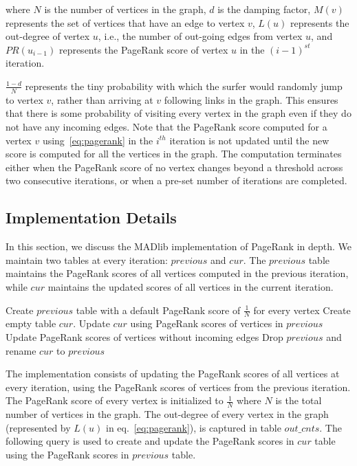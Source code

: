 where $N$ is the number of vertices in the graph, $d$ is the damping factor,
$M(v)$ represents the set of vertices that have an edge to vertex $v$,
$L(u)$ represents the out-degree of vertex $u$, i.e., the number of
out-going edges from vertex $u$, and $PR(u_{i-1})$ represents the PageRank
score of vertex $u$ in the $(i-1)^{st}$ iteration.

$\frac{1-d}{N}$ represents the tiny probability with which the surfer
would randomly jump to vertex $v$, rather than arriving at $v$ following
links in the graph. This ensures that there is some probability of visiting
every vertex in the graph even if they do not have any incoming edges. Note
that the PageRank score computed for a vertex $v$ using~\ref{eq:pagerank}
in the $i^{th}$ iteration is not updated until the new score is computed for
all the vertices in the graph. The computation terminates either when the
PageRank score of no vertex changes beyond a threshold across two consecutive
iterations, or when a pre-set number of iterations are completed.

\subsection{Implementation Details} \label{sec:pagerank:implementation}

In this section, we discuss the MADlib implementation of PageRank in depth.
We maintain two tables at every iteration: $previous$ and $cur$. The
$previous$ table maintains the PageRank scores of all vertices computed in
the previous iteration, while $cur$ maintains the updated scores of all
vertices in the current iteration.

\begin{algorithm}[PageRank$(V,E)$] \label{alg:pagerank:high}
\begin{algorithmic}[1]
    \State Create $previous$ table with a default PageRank score of
            $\frac{1}{N}$ for every vertex
    \Repeat
        \State Create empty table $cur$.
        \State Update $cur$ using PageRank scores of vertices in $previous$
        \State Update PageRank scores of vertices without incoming edges
        \State Drop $previous$ and rename $cur$ to $previous$
\end{algorithmic}
\end{algorithm}

The implementation consists of updating the PageRank scores of all vertices
at every iteration, using the PageRank scores of vertices from the previous
iteration. The PageRank score of every vertex is initialized to $\frac{1}{N}$
where $N$ is the total number of vertices in the graph. The out-degree of
every vertex in the graph (represented by $L(u)$ in eq.~\ref{eq:pagerank}),
is captured in table $out\_cnts$. The following query is used to create and
update the PageRank scores in $cur$ table using the PageRank scores in
$previous$ table.

